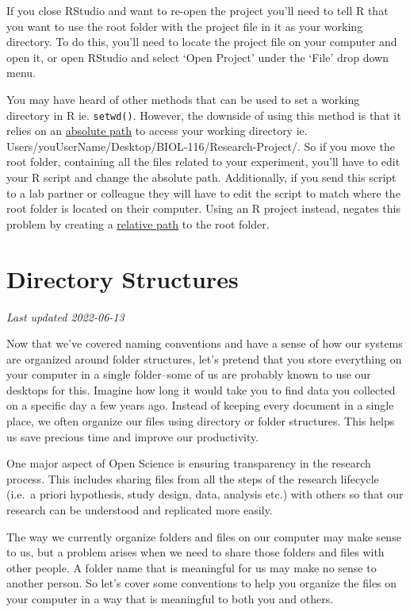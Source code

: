 \documentclass[
]{book}
\begin{document}
If you close RStudio and want to re-open the project you'll need to tell R that you want to use the root folder with the project file in it as your working directory. To do this, you'll need to locate the project file on your computer and open it, or open RStudio and select `Open Project' under the `File' drop down menu.

You may have heard of other methods that can be used to set a working directory in R ie. \texttt{setwd()}. However, the downside of using this method is that it relies on an \href{https://ubco-biology.github.io/Procedures-and-Guidelines/relative-and-absolute-paths}{absolute path} to access your working directory ie. Users/youUserName/Desktop/BIOL-116/Research-Project/. So if you move the root folder, containing all the files related to your experiment, you'll have to edit your R script and change the absolute path. Additionally, if you send this script to a lab partner or colleague they will have to edit the script to match where the root folder is located on their computer. Using an R project instead, negates this problem by creating a \href{https://ubco-biology.github.io/Procedures-and-Guidelines/relative-and-absolute-paths}{relative path} to the root folder.

\hypertarget{directory-structures}{%
\chapter{Directory Structures}\label{directory-structures}}

\emph{Last updated 2022-06-13}

Now that we've covered naming conventions and have a sense of how our systems are organized around folder structures, let's pretend that you store everything on your computer in a single folder--some of us are probably known to use our desktops for this. Imagine how long it would take you to find data you collected on a specific day a few years ago. Instead of keeping every document in a single place, we often organize our files using directory or folder structures. This helps us save precious time and improve our productivity.

One major aspect of Open Science is ensuring transparency in the research process. This includes sharing files from all the steps of the research lifecycle (i.e.~a priori hypothesis, study design, data, analysis etc.) with others so that our research can be understood and replicated more easily.

The way we currently organize folders and files on our computer may make sense to us, but a problem arises when we need to share those folders and files with other people. A folder name that is meaningful for us may make no sense to another person. So let's cover some conventions to help you organize the files on your computer in a way that is meaningful to both you and others.
\end{document}
